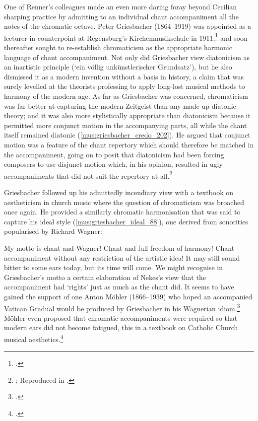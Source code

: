 \label{hl:griesbacher}%
One of Renner's colleagues made an even more daring foray beyond Cecilian sharping practice by admitting to an individual chant accompaniment all the notes of the chromatic octave.
Peter Griesbacher (1864--1919) was appointed as a lecturer in counterpoint at Regensburg's Kirchenmusikschule in 1911,\footcite[55]{MusikalischeRundschau1911} and soon thereafter sought to re-establish chromaticism as the appropriate harmonic language of chant accompaniment.
Not only did Griesbacher view diatonicism as an inartistic principle (`ein völlig unkünstlerischer Grundsatz'), but he also dismissed it as a modern invention without a basis in history, a claim that was surely levelled at the theorists professing to apply long-lost musical methods to harmony of the modern age.
As far as Griesbacher was concerned, chromaticism was far better at capturing the modern Zeitgeist than any made-up diatonic theory; and it was also more stylistically appropriate than diatonicism because it permitted more conjunct motion in the accompanying parts, all while the chant itself remained diatonic (\cref{mus:griesbacher_credo_202}).
He argued that conjunct motion was a feature of the chant repertory which should therefore be matched in the accompaniment, going on to posit that diatonicism had been forcing composers to use disjunct motion which, in his opinion, resulted in ugly accompaniments that did not suit the repertory at all.\footnote{\covid{}\cite{GriesbacherQuatuormodicantandi1911}; Reproduced in \cite[202]{GriesbacherChoralundChroma1912}.}

Griesbacher followed up his admittedly incendiary view with a textbook on aestheticism in church music where the question of chromaticism was broached once again.
He provided a similarly chromatic harmonisation that was said to capture his ideal style (\cref{mus:griesbacher_ideal_88}), one derived from sonorities popularised by Richard Wagner:

  {\cite[88--9]{GriesbacherKirchenmusikalischestilistikund1912}}
{My motto is chant and Wagner! Chant and full freedom of harmony! Chant accompaniment without any restriction of the artistic idea! It may still sound bitter to some ears today, but its time will come.}
\noindent
We might recognise in Griesbacher's motto a certain elaboration of Nekes's view that the accompaniment had `rights' just as much as the chant did.
It seems to have gained the support of one Anton Möhler (1866--1939) who hoped an accompanied Vatican Gradual would be produced by Griesbacher in his Wagnerian idiom.\footcite[32]{MohlerUberChoralbegleitung1912}
Möhler even proposed that chromatic accompaniments were required so that modern ears did not become fatigued, this in a textbook on Catholic Church musical aesthetics.\footcite[144--6]{MoehlerAesthetikkatholischenKirchenmusik1915}

